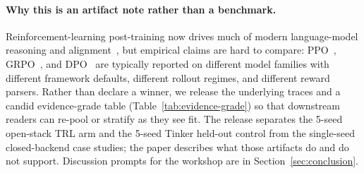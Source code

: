 \paragraph{Why this is an artifact note rather than a benchmark.}
Reinforcement-learning post-training now drives much of modern language-model
reasoning and alignment~\citep{ouyang2022training,guo2025deepseekr1nature},
but empirical claims are hard to compare:
PPO~\citep{schulman2017proximal}, GRPO~\citep{shao2024deepseekmath}, and
DPO~\citep{rafailov2024direct} are typically reported on different model
families with different framework defaults, different rollout regimes, and
different reward parsers. Rather than declare a winner, we release the
underlying traces and a candid evidence-grade table
(Table~\ref{tab:evidence-grade}) so that downstream readers can re-pool
or stratify as they see fit. The release separates the 5-seed open-stack TRL arm and the 5-seed
Tinker held-out control from the single-seed closed-backend \tinker{} case
studies; the paper describes what those artifacts do and do not support. Discussion prompts for the workshop are
in Section~\ref{sec:conclusion}.
